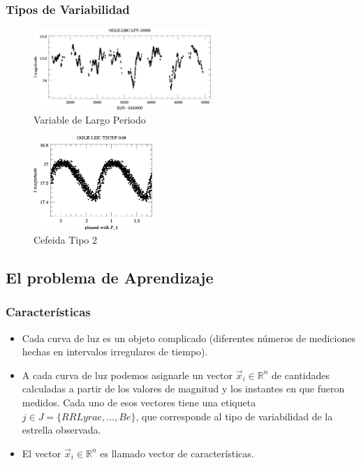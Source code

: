 \documentclass{beamer}
\begin{document}
\begin{frame}
  \frametitle{Tipos de Variabilidad}
  \begin{figure}
    \centering
    \includegraphics[width=0.6\textwidth]{./img/OGLE-LMC-LPV-10000.jpg}
    \caption{Variable de Largo Periodo}
  \end{figure}%
  \begin{figure}
    \centering
    \includegraphics[width=0.4\textwidth]{./img/OGLE-LMC-T2CEP-049_1.jpg}
    \caption{Cefeida Tipo 2}
  \end{figure}%
  
\end{frame}


\subsection{El problema de Aprendizaje}
\begin{frame}%
  \frametitle{Características}
\begin{itemize}
   \item Cada curva de luz es un objeto complicado (diferentes números de mediciones hechas en intervalos irregulares de tiempo).  
   \item A cada curva de luz podemos asignarle un vector $\vec{x}_i\in\mathbb{R}^n$ de cantidades calculadas a partir de los valores de magnitud y los instantes en que fueron medidos. Cada uno de esos vectores tiene una etiqueta $j\in J = \{RR Lyrae,..., Be\}$, que corresponde al tipo de variabilidad de la estrella observada.
     \item El vector $\vec{x}_i\in\mathbb{R}^n$  es llamado vector de características.
\end{itemize}
\end{frame}
\end{document}
